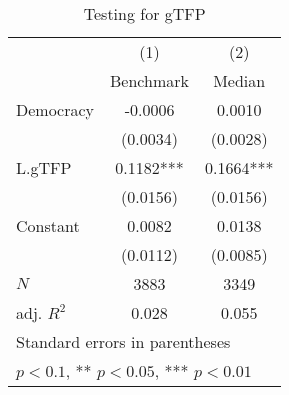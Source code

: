 \begin{table}[htbp]\centering
\def\sym#1{\ifmmode^{#1}\else\(^{#1}\)\fi}
\caption{Testing for gTFP \label{tab:regression8}}
\begin{tabular}{l*{2}{c}}
\hline\hline
            &\multicolumn{1}{c}{(1)}&\multicolumn{1}{c}{(2)}\\
            &\multicolumn{1}{c}{Benchmark}&\multicolumn{1}{c}{Median}\\
\hline
Democracy   &     -0.0006   &      0.0010   \\
            &    (0.0034)   &    (0.0028)   \\
[1em]
L.gTFP      &      0.1182***&      0.1664***\\
            &    (0.0156)   &    (0.0156)   \\
[1em]
Constant    &      0.0082   &      0.0138   \\
            &    (0.0112)   &    (0.0085)   \\
\hline
\(N\)       &        3883   &        3349   \\
adj. \(R^{2}\)&       0.028   &       0.055   \\
\hline\hline
\multicolumn{3}{l}{\footnotesize Standard errors in parentheses}\\
\multicolumn{3}{l}{\footnotesize * \(p<0.1\), ** \(p<0.05\), *** \(p<0.01\)}\\
\end{tabular}
\end{table}
